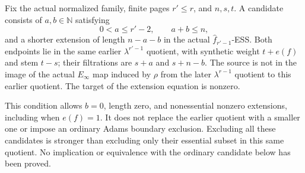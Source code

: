 \begin{definition}
  \label{def:finite-page-extension-nonliftable-crossing}
  \leanok
  Fix the actual normalized family, finite pages $r'\le r$, and $n,s,t$.
  A candidate consists of $a,b\in\mathbb N$ satisfying
  \[
    0<a\le r'-2,\qquad a+b\le n,
  \]
  and a shorter extension of length $n-a-b$ in the actual
  $\widehat f_{r'-1}$-ESS. Both endpoints lie in the same earlier
  $\lambda^{r'-1}$ quotient, with synthetic weight $t+e(f)$ and stem
  $t-s$; their filtrations are $s+a$ and $s+n-b$.
  The source is not in the image of the actual $E_\infty$ map induced
  by $\rho$ from the later $\lambda^{r-1}$ quotient to this earlier
  quotient. The target of the extension equation is nonzero.

  This condition allows $b=0$, length zero, and nonessential nonzero
  extensions, including when $e(f)=1$. It does not replace the earlier
  quotient with a smaller one or impose an ordinary Adams boundary
  exclusion. Excluding all these candidates is stronger than excluding
  only their essential subset in this same quotient. No implication or
  equivalence with the ordinary candidate below has been proved.
\end{definition}

